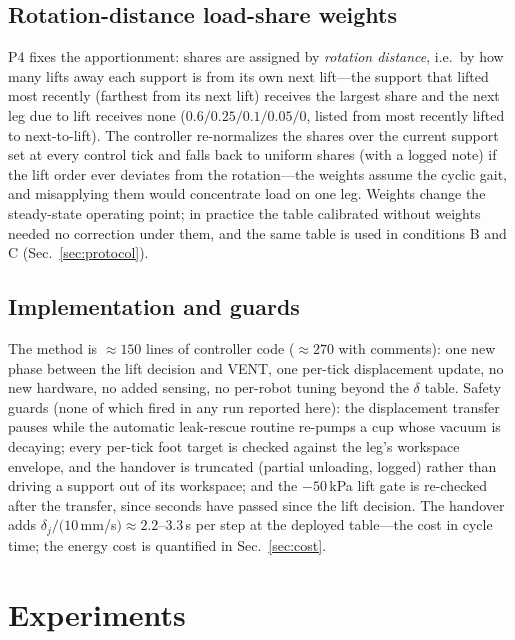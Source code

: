 \documentclass[journal]{IEEEtran}
\begin{document}
\subsection{Rotation-distance load-share weights}

P4 fixes the apportionment: shares are assigned by \emph{rotation
distance}, i.e.\ by how many lifts away each support is from its own
next lift---the support that lifted most recently (farthest from its
next lift) receives the largest share and the next leg due to lift
receives none ($0.6/0.25/0.1/0.05/0$, listed from most recently lifted
to next-to-lift). The controller re-normalizes the shares over the
current support set at every control tick and falls back to uniform
shares (with a logged note) if the lift order ever deviates from the
rotation---the weights assume the cyclic gait, and misapplying them
would concentrate load on one leg. Weights change the steady-state
operating point; in practice the table calibrated without weights
needed no correction under them, and the same table is used in
conditions B and C (Sec.~\ref{sec:protocol}).

\subsection{Implementation and guards}

The method is ${\approx}150$ lines of controller code (${\approx}270$
with comments): one new phase
between the lift decision and VENT, one per-tick displacement update,
no new hardware, no added sensing, no per-robot tuning beyond the
$\delta$ table. Safety guards (none of which fired in any run reported here):
the displacement transfer pauses while the automatic leak-rescue
routine re-pumps a cup whose vacuum is decaying; every per-tick foot
target is checked against the leg's workspace envelope, and the
handover is truncated (partial unloading, logged) rather than driving a
support out of its workspace; and the $-50$\,kPa lift gate is
re-checked after the transfer, since seconds have passed since the lift
decision. The handover adds $\delta_j/(10$\,mm/s$)\approx2.2$--$3.3$\,s
per step at the deployed table---the cost in cycle time; the energy
cost is quantified in Sec.~\ref{sec:cost}.

\section{Experiments}
\label{sec:experiments}
\end{document}
